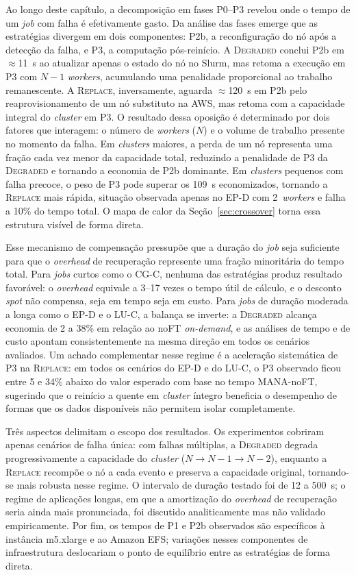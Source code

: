 Ao longo deste capítulo, a decomposição em fases P0--P3 revelou onde o tempo de
um \textit{job} com falha é efetivamente gasto. Da análise das fases emerge que
as estratégias divergem em dois componentes: P2b, a reconfiguração do nó após a
detecção da falha, e P3, a computação pós-reinício. A \textsc{Degraded} conclui
P2b em $\approx$11~s ao atualizar apenas o estado do nó no Slurm, mas retoma a
execução em P3 com $N{-}1$ \textit{workers}, acumulando uma penalidade proporcional
ao trabalho remanescente. A \textsc{Replace}, inversamente, aguarda $\approx$120~s
em P2b pelo reaprovisionamento de um nó substituto na AWS, mas retoma com a
capacidade integral do \textit{cluster} em P3. O resultado dessa oposição é
determinado por
dois fatores que interagem: o número de \textit{workers} ($N$) e o volume de
trabalho presente no momento da falha. Em \textit{clusters} maiores, a perda de
um nó representa uma fração cada vez menor da capacidade total, reduzindo a
penalidade de P3 da \textsc{Degraded} e tornando a economia de P2b dominante. Em
\textit{clusters} pequenos com falha precoce, o peso de P3 pode superar os 109~s
economizados, tornando a \textsc{Replace} mais rápida, situação observada apenas
no EP-D com 2~\textit{workers} e falha a 10\% do tempo total. O mapa de calor da
Seção~\ref{sec:crossover} torna essa estrutura visível de forma direta.

Esse mecanismo de compensação pressupõe que a duração do \textit{job} seja
suficiente para que o \textit{overhead} de recuperação represente uma fração
minoritária do tempo total. Para \textit{jobs} curtos como o CG-C, nenhuma das
estratégias produz resultado favorável: o \textit{overhead} equivale a 3--17
vezes o tempo útil de cálculo, e o desconto \textit{spot} não compensa, seja em
tempo seja em custo. Para \textit{jobs} de duração moderada a longa como o EP-D
e o LU-C, a balança se inverte: a \textsc{Degraded} alcança economia de 2 a 38\%
em relação ao noFT \textit{on-demand}, e as análises de tempo e de custo apontam
consistentemente na mesma direção em todos os cenários avaliados. Um achado
complementar nesse regime é a aceleração sistemática de P3 na \textsc{Replace}:
em todos os cenários do EP-D e do LU-C, o P3 observado ficou entre 5 e 34\%
abaixo do valor esperado com base no tempo MANA-noFT, sugerindo que o reinício
a quente em \textit{cluster} íntegro beneficia o desempenho de formas que os
dados disponíveis não permitem isolar completamente.

Três aspectos delimitam o escopo dos resultados. Os experimentos cobriram apenas
cenários de falha única: com falhas múltiplas, a \textsc{Degraded} degrada
progressivamente a capacidade do \textit{cluster}
($N \rightarrow N\!-\!1 \rightarrow N\!-\!2$), enquanto a \textsc{Replace}
recompõe o nó a cada evento e preserva a capacidade original, tornando-se mais
robusta nesse regime. O intervalo de duração testado foi de 12 a 500~s; o
regime de aplicações longas, em que a amortização do \textit{overhead} de
recuperação seria ainda mais pronunciada, foi discutido analiticamente mas não
validado empiricamente. Por fim, os tempos de P1 e P2b observados são específicos
à instância m5.xlarge e ao Amazon EFS; variações nesses componentes de
infraestrutura deslocariam o ponto de equilíbrio entre as estratégias de forma
direta.



